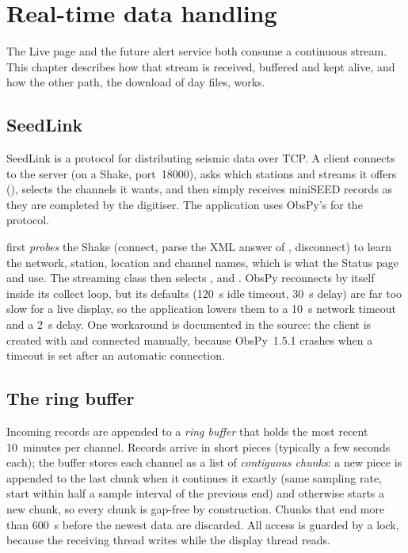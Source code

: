 \chapter{Real-time data handling}\label{ch:realtime}

The Live page and the future alert service both consume a continuous stream. This chapter describes how that stream is
received, buffered and kept alive, and how the other path, the download of day files, works.

\section{SeedLink}
SeedLink is a protocol for distributing seismic data over TCP. A client connects to the server (on a Shake, port~18000),
asks which stations and streams it offers (), selects the channels it wants, and then simply
receives miniSEED records as they are completed by the digitiser. The application uses ObsPy's
 for the protocol.

\begin{rs3dapp}
 first \emph{probes} the Shake (connect, parse the XML answer of , disconnect)
to learn the network, station, location and channel names, which is what the Status page and  use. The
streaming class  then selects ,  and . ObsPy reconnects by itself
inside its collect loop, but its defaults (120~s idle timeout, 30~s delay) are far too slow for a live display, so the
application lowers them to a 10~s network timeout and a 2~s delay. One workaround is documented in the source: the
client is created with  and connected manually, because ObsPy~1.5.1 crashes when a timeout is
set after an automatic connection.
\end{rs3dapp}

\section{The ring buffer}
Incoming records are appended to a \emph{ring buffer} that holds the most recent 10~minutes per channel. Records arrive
in short pieces (typically a few seconds each); the buffer stores each channel as a list of \emph{contiguous chunks}:
a new piece is appended to the last chunk when it continues it exactly (same sampling rate, start within half a
sample interval of the previous end) and otherwise starts a new chunk, so every chunk is gap-free by construction.
Chunks that end more than 600~s before the newest data are discarded. All access is guarded by a lock, because
the receiving thread writes while the display thread reads.

